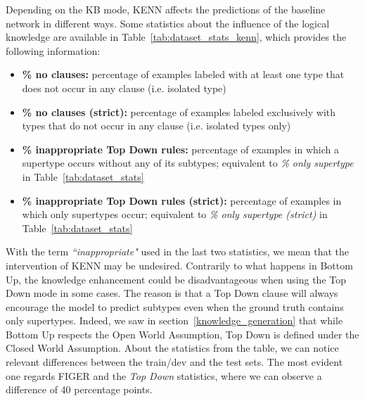Depending on the KB mode, KENN affects the predictions of the baseline network in different ways. Some statistics about the influence of the logical knowledge are available in Table~\ref{tab:dataset_stats_kenn}, which provides the following information:
\begin{itemize}
    \item \textbf{\% no clauses:} percentage of examples labeled with at least one type that does not occur in any clause (i.e. isolated type)
    \item \textbf{\% no clauses (strict):} percentage of examples labeled exclusively with types that do not occur in any clause (i.e. isolated types only)
    \item \textbf{\% inappropriate Top Down rules:} percentage of examples in which a supertype occurs without any of its subtypes; equivalent to \textit{\% only supertype} in Table~\ref{tab:dataset_stats}
    \item \textbf{\% inappropriate Top Down rules (strict):} percentage of examples in which only supertypes occur; equivalent to \textit{\% only supertype (strict)} in Table~\ref{tab:dataset_stats}
\end{itemize}
With the term \textit{``inappropriate"} used in the last two statistics, we mean that the intervention of KENN may be undesired. Contrarily to what happens in Bottom Up, the knowledge enhancement could be disadvantageous when using the Top Down mode in some cases. The reason is that a Top Down clause will always encourage the model to predict subtypes even when the ground truth contains only supertypes. Indeed, we saw in section~\ref{knowledge_generation} that while Bottom Up respects the Open World Assumption, Top Down is defined under the Closed World Assumption. About the statistics from the table, we can notice relevant differences between the train/dev and the test sets. The most evident one regards FIGER and the \textit{Top Down} statistics, where we can observe a difference of 40 percentage points.


